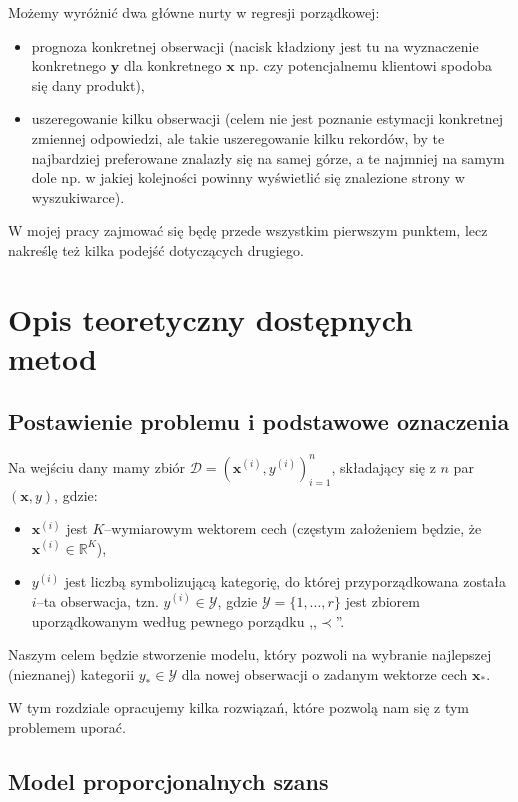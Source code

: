 \documentclass{mini}
\begin{document}
Możemy wyróżnić dwa główne nurty w regresji porządkowej:
\begin{itemize}
	\item prognoza konkretnej obserwacji (nacisk kładziony jest tu na wyznaczenie konkretnego $\textbf{y}$ dla konkretnego $\textbf{x}$ np. czy potencjalnemu klientowi spodoba się dany produkt),
	\item uszeregowanie kilku obserwacji (celem nie jest poznanie estymacji konkretnej zmiennej odpowiedzi, ale takie uszeregowanie kilku rekordów, by te najbardziej preferowane znalazły się na samej górze, a te najmniej na samym dole np. w jakiej kolejności powinny wyświetlić się znalezione strony w wyszukiwarce). 
\end{itemize}

W mojej pracy zajmować się będę przede wszystkim pierwszym punktem, lecz nakreślę też kilka podejść dotyczących drugiego. 


\chapter{Opis teoretyczny dostępnych metod}


\section{Postawienie problemu i podstawowe oznaczenia}

Na wejściu dany mamy zbiór $\mathcal{D} = (\mathbf{x}^{(i)}, y^{(i)})_{i=1}^n$, składający się z $n$ par $(\mathbf{x}, y)$, gdzie:
\begin{itemize}
\item $\mathbf{x}^{(i)}$ jest $K$--wymiarowym wektorem cech (częstym założeniem będzie, że $\mathbf{x}^{(i)}\in \mathbb{R}^K$),  
\item $y^{(i)}$ jest liczbą symbolizującą kategorię, do której przyporządkowana została $i$--ta obserwacja, tzn. $y^{(i)}\in\mathcal{Y}$, gdzie $\mathcal{Y} = \lbrace 1,\ldots ,r \rbrace$ jest zbiorem uporządkowanym według pewnego porządku ,,$\prec$''. 
\end{itemize}
Naszym celem będzie stworzenie modelu, który pozwoli na wybranie najlepszej (nieznanej) kategorii $y_{\ast}\in\mathcal{Y}$ dla nowej obserwacji o zadanym wektorze cech $\mathbf{x}_{\ast}$. 

W tym rozdziale opracujemy kilka rozwiązań, które pozwolą nam się z tym problemem uporać.

\section{Model proporcjonalnych szans}
\end{document}
